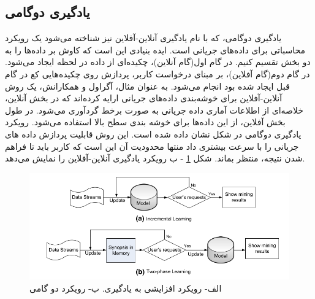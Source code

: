 \subsection{یادگیری دوگامی}
یادگیری دوگامی، که با نام یادگیری آنلاین-آفلاین نیز شناخته می‌شود یک رویکرد محاسباتی برای داده‌های جریانی است. ایده‌ بنیادی این است که کاوش بر داده‌ها را به دو بخش تقسیم کنیم. در گام اول(گام آنلاین)، چکیده‌ای از داده در لحظه ایجاد می‌شود. در گام دوم(گام آفلاین)، بر مبنای درخواست کاربر، پردازش روی چکیده‌هایی کع در گام قبل ایجاد شده بود انجام می‌شود.
به عنوان مثال، آگراول
 و همکارانش، یک روش آنلاین-آفلاین برای خوشه‌بندی داده‌های جریانی ارایه کرده‌اند که در بخش آنلاین، خلاصه‌ای از اطلاعات آماری داده جریانی به صورت برخط گردآوری می‌شود. در طول بخش آفلاین، از این داده‌ها برای خوشه بندی سطح بالا استفاده می‌شود. رویکرد یادگیری دوگامی در شکل نشان داده شده است. این روش قابلیت پردازش داده های جریانی را با سرعت بیشتری داد منتها محدودیت آن این است که کاربر باید تا فراهم شدن نتیجه، منتظر بماند.
شکل
\ref{fig:approach}
- ب رویکرد یادگیری آنلاین-آفلاین را نمایش می‌دهد.




\begin{figure}%
\centerline{\includegraphics[width=15cm]{approach}}
\caption{الف- رویکرد افزایشی به یادگیری. ب- رویکرد دو گامی}
\label{fig:approach}
\end{figure}


